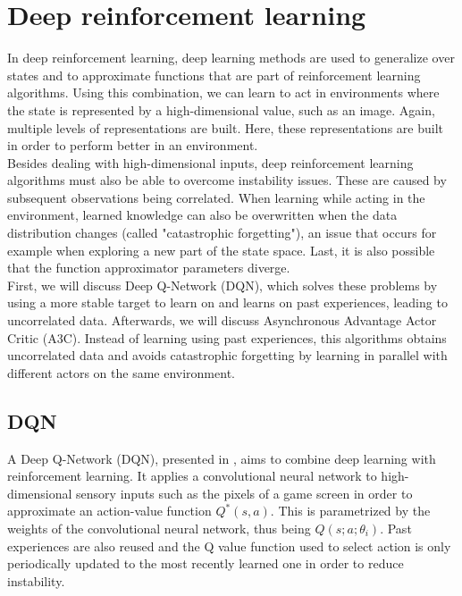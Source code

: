 \chapter{Deep reinforcement learning} %
\label{cha:deep_reinforcement_learning}
In deep reinforcement learning, deep learning methods are used to generalize over states and to approximate functions that are part of reinforcement learning algorithms.
Using this combination, we can learn to act in environments where the state is represented by a high-dimensional value, such as an image.
Again, multiple levels of representations are built. Here, these representations are built in order to perform better in an environment.\\
Besides dealing with high-dimensional inputs, deep reinforcement learning algorithms must also be able to overcome instability issues. These are caused by subsequent observations being correlated. When learning while acting in the environment, learned knowledge can also be overwritten when the data distribution changes (called "catastrophic forgetting"),  an issue that occurs for example when exploring a new part of the state space. Last, it is also possible that the function approximator parameters diverge.\\

First, we will discuss Deep Q-Network (DQN), which solves these problems by using a more stable target to learn on and learns on past experiences, leading to uncorrelated data. Afterwards, we will discuss Asynchronous Advantage Actor Critic (A3C). Instead of learning using past experiences, this algorithms obtains uncorrelated data and avoids catastrophic forgetting by learning in parallel with different actors on the same environment.

\section{DQN}
\label{sec:dqn}
A Deep Q-Network (DQN), presented in \cite{Mnih2015Human-levelLearning}, aims to combine deep learning with reinforcement learning.
It applies a convolutional neural network to high-dimensional sensory inputs such as the pixels of a game screen in order to approximate an action-value function $Q^{*}(s,a)$.
This is parametrized by the weights of the convolutional neural network, thus being $Q(s;a;\theta_i)$.
Past experiences are also reused and the Q value function used to select action is only periodically updated to the most recently learned one in order to reduce instability.\\

